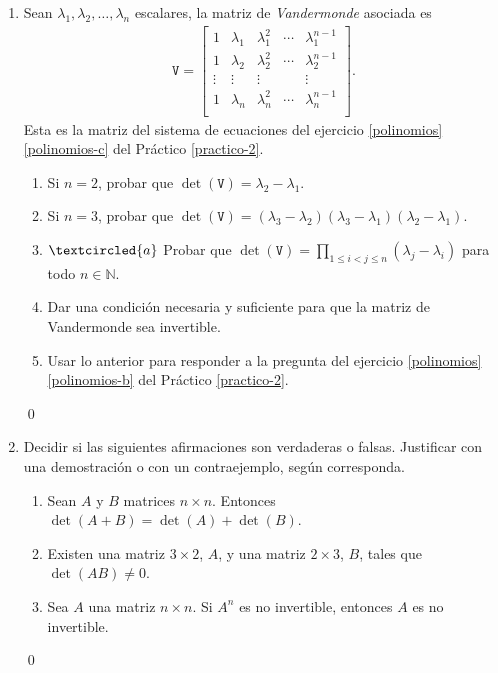 \begin{enumerate}[topsep=6pt,itemsep=.4cm]
    \qed
    
    \item\label{vandermonde} Sean $\lambda_1, \lambda_2, \dots, \lambda_n$ escalares, la matriz de \emph{Vandermonde} asociada es
    \begin{align*}
    \mathtt V = \begin{bmatrix}
    1 & \lambda_1 & \lambda_1^2 & \cdots & \lambda_1^{n-1}\\
    1 & \lambda_2 & \lambda_2^2 & \cdots & \lambda_2^{n-1}\\
    \vdots &\vdots &\vdots & &\vdots\\
    1 & \lambda_n & \lambda_n^2 & \cdots & \lambda_n^{n-1}\\
    \end{bmatrix}.
    \end{align*}
    Esta es la matriz del sistema de ecuaciones del ejercicio \ref{polinomios}\,\ref{polinomios-c} del Práctico \ref{practico-2}.
    
    
    \begin{enumerate}
        \item Si $n=2$, probar que $\det(\mathtt V) = \lambda_2-\lambda_1$.
        \item Si $n=3$, probar que $\det(\mathtt V) = (\lambda_3-\lambda_2) (\lambda_3-\lambda_1) (\lambda_2-\lambda_1)$.
        \item\label{vandermonde gral} $\textcircled{a}$ Probar que $\det(\mathtt V) = \prod_{1\leq i< j \leq n}(\lambda_j-\lambda_i)$ para todo $n\in\mathbb{N}$.
        \item Dar una condición necesaria y suficiente para que la matriz de Vandermonde sea invertible.
        \item Usar lo anterior para responder a la pregunta del ejercicio \ref{polinomios}\,\ref{polinomios-b} del Práctico \ref{practico-2}.
        \end{enumerate}
    \rta

    \qed
        
    \item Decidir si las siguientes afirmaciones son verdaderas o falsas. Justificar con una demostración o con un contraejemplo, según corresponda.
        \begin{enumerate}
        \item Sean $A$ y $B$ matrices $n \times n$. Entonces $\det(A + B) = \det (A) + \det(B)$.
        \item Existen una matriz $3\times 2$, $A$, y una matriz $2\times 3$, $B$, tales que $\det(AB) \neq 0$.
        \item Sea $A$ una matriz $n\times n$. Si $A^n$ es no invertible, entonces $A$ es no invertible.
    \end{enumerate}
    \rta

    \qed
    
    \end{enumerate}
    